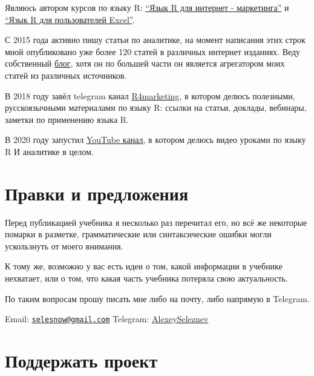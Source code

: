 \documentclass[
]{book}
\begin{document}
Являюсь автором курсов по языку R: \href{https://needfordata.ru/r}{``Язык R для интернет - маркетинга''} и \href{https://www.youtube.com/playlist?list=PLD2LDq8edf4pgGg16wYMobvIYy_0MI0kF}{``Язык R для пользователей Excel''}.

С 2015 года активно пишу статьи по аналитике, на момент написания этих строк мной опубликовано уже более 120 статей в различных интернет изданиях. Веду собственный \href{https://alexeyseleznev.wordpress.com/}{блог}, хотя он по большей части он является агрегатором моих статей из различных источников.

В 2018 году завёл telegram канал \href{https://t.me/R4marketing}{R4marketing}, в котором делюсь полезными, русскоязычными материалами по языку R: ссылки на статьи, доклады, вебинары, заметки по применению языка R.

В 2020 году запустил \href{https://bit.ly/36kliAp}{YouTube канал}, в котором делюсь видео уроками по языку R И аналитике в целом.

\hypertarget{ux43fux440ux430ux432ux43aux438-ux438-ux43fux440ux435ux434ux43bux43eux436ux435ux43dux438ux44f}{%
\section*{Правки и предложения}\label{ux43fux440ux430ux432ux43aux438-ux438-ux43fux440ux435ux434ux43bux43eux436ux435ux43dux438ux44f}}

Перед публикацией учебника я несколько раз перечитал его, но всё же некоторые помарки в разметке, грамматические или синтаксические ошибки могли ускользнуть от моего внимания.

К тому же, возможно у вас есть идеи о том, какой информации в учебнике нехватает, или о том, что какая часть учебника потеряла свою актуальность.

По таким вопросам прошу писать мне либо на почту, либо напрямую в Telegram.

Email: \href{mailto:selesnow@gmail.com}{\nolinkurl{selesnow@gmail.com}}
Telegram: \href{http://t.me/AlexeySeleznev}{AlexeySeleznev}

\hypertarget{ux43fux43eux434ux434ux435ux440ux436ux430ux442ux44c-ux43fux440ux43eux435ux43aux442}{%
\section*{Поддержать проект}\label{ux43fux43eux434ux434ux435ux440ux436ux430ux442ux44c-ux43fux440ux43eux435ux43aux442}}
\end{document}

